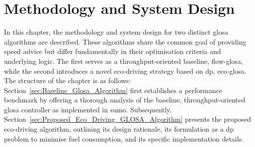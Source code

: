 \chapter{Methodology and System Design}
\label{ch:Methodology_System_Design}

In this chapter, the methodology and system design for two distinct \ac{glosa} algorithms are described. These algorithms share the common goal of providing speed advice but differ fundamentally in their optimisation criteria and underlying logic. The first serves as a throughput-oriented baseline, \ac{flow-glosa}, while the second introduces a novel eco-driving strategy based on \ac{dp}, \ac{eco-glosa}.
\mynewline
The structure of the chapter is as follows: Section~\vref{sec:Baseline_Glosa_Algorithm} first establishes a performance benchmark by offering a thorough analysis of the baseline, throughput-oriented \ac{glosa} controller as implemented in \ac{sumo}. Subsequently, Section~\vref{sec:Proposed_Eco_Driving_GLOSA_Algorithm} presents the proposed eco-driving algorithm, outlining its design rationale, its formulation as a \ac{dp} problem to minimise fuel consumption, and its specific implementation details.




